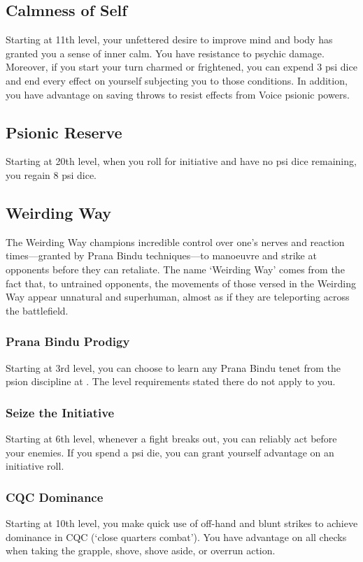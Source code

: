 \subsection{Calmness of Self}
Starting at 11th level,
your unfettered desire to improve mind and body
has granted you a sense of inner calm.
You have resistance to psychic damage.
Moreover, if you start your turn charmed or frightened,
you can expend 3 psi dice and end every effect on yourself
subjecting you to those conditions.
In addition, you have advantage on saving throws to resist
effects from Voice psionic powers.

\subsection{Psionic Reserve}
Starting at 20th level,
when you roll for initiative and have no psi dice remaining,
you regain 8 psi dice.

\subsection{Weirding Way}
The Weirding Way champions incredible control over one's nerves
and reaction times---granted by Prana Bindu techniques---to
manoeuvre and strike at opponents before they can retaliate.
The name `Weirding Way' comes from the fact that,
to untrained opponents, the movements of those versed in
the Weirding Way appear unnatural and superhuman,
almost as if they are teleporting across the battlefield.

\subsubsection{Prana Bindu Prodigy}
Starting at 3rd level,
you can choose to learn any Prana Bindu tenet from
the psion discipline at .
The level requirements stated there do not apply to you.

\subsubsection{Seize the Initiative}
Starting at 6th level,
whenever a fight breaks out,
you can reliably act before your enemies.
If you spend a psi die,
you can grant yourself advantage on an initiative roll.

\subsubsection{CQC Dominance}
Starting at 10th level,
you make quick use of off-hand and blunt strikes to
achieve dominance in CQC (`close quarters combat').
You have advantage on all checks when taking the
grapple, shove, shove aside, or overrun action.

